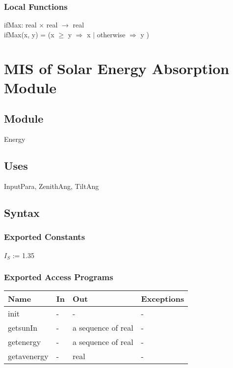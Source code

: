 \documentclass[12pt, titlepage]{article}
\begin{document}
\subsubsection{Local Functions}

ifMax: real $\times$ real $\rightarrow$ real\\
ifMax(x, y) = (x $\geq$ y $\Rightarrow$ x $|$ otherwise $\Rightarrow$ y )

 



\section{MIS of Solar Energy Absorption Module} \label{ModuleSEA} 

\subsection{Module}
Energy

\subsection{Uses}
InputPara, ZenithAng, TiltAng

\subsection{Syntax}

\subsubsection{Exported Constants}

$I_{S}$ := 1.35\\

\subsubsection{Exported Access Programs}

\begin{center}
\begin{tabular}{p{2cm} p{4cm} p{4cm} p{2cm}}
\hline
\textbf{Name} & \textbf{In} & \textbf{Out} & \textbf{Exceptions} \\
\hline 
init & - & - & - \\
getsunIn & - & a sequence of real & - \\
getenergy & - & a sequence of real & - \\
getavenergy & - & real & - \\

\hline
\end{tabular}
\end{center}
\end{document}
